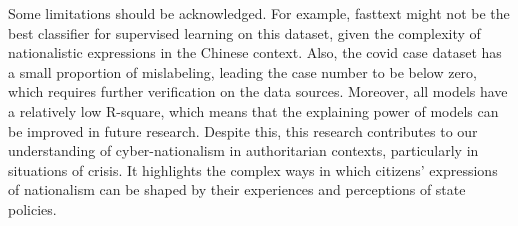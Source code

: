 \documentclass[12pt, ]{article}
\newenvironment{CSLReferences}[2]{

\clearpage
}{}
\begin{document}
Some limitations should be acknowledged. For example, fasttext might not be the best classifier for supervised learning on this dataset, given the complexity of nationalistic expressions in the Chinese context. Also, the covid case dataset has a small proportion of mislabeling, leading the case number to be below zero, which requires further verification on the data sources. Moreover, all models have a relatively low R-square, which means that the explaining power of models can be improved in future research. Despite this, this research contributes to our understanding of cyber-nationalism in authoritarian contexts, particularly in situations of crisis. It highlights the complex ways in which citizens' expressions of nationalism can be shaped by their experiences and perceptions of state policies.



\hypertarget{refs}{}

\begin{CSLReferences}{0}{0}\end{CSLReferences}




\end{document}
